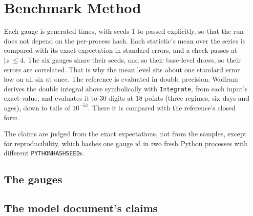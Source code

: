 \documentclass[11pt,a4paper]{article}
\begin{document}
\section{Benchmark Method}

Each gauge is generated \bmReps{} times, with seeds 1 to \bmReps{} passed explicitly,
so that the run does not depend on the per-process hash. Each statistic's mean over
the series is compared with its exact expectation in standard errors, and a check
passes at $|z|\le4$. The six gauges share their seeds, and so their base-level draws,
so their errors are correlated. That is why the mean level sits about one standard
error low on all six at once. The reference is evaluated in double precision.
Wolfram derives the double integral above symbolically with \texttt{Integrate}, from
each input's exact value, and evaluates it to 30 digits at 18 points (three regimes,
six days and ages), down to tails of $10^{-53}$. There it is compared with the
reference's closed form.

The claims are judged from the exact expectations, not from the samples, except for
reproducibility, which hashes one gauge id in two fresh Python processes with
different \texttt{PYTHONHASHSEED}s.

\mkmvalidation



\subsection{The gauges}


\subsection{The model document's claims}


\mkmlimitations
\end{document}
